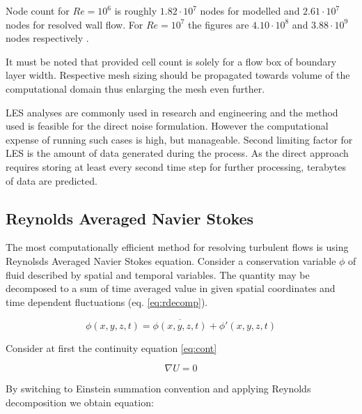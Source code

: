 Node count for $Re = 10^6$ is roughly $1.82 \cdot 10^{7}$ nodes for modelled and $2.61 \cdot 10^{7}$ nodes for resolved wall flow. For $Re = 10^7$ the figures are $4.10 \cdot 10^{8}$ and $3.88 \cdot 10^{9}$ nodes respectively \citep{LES_size}.

It must be noted that provided cell count is solely for a flow box of boundary layer width. Respective mesh sizing should be propagated towards volume of the computational domain thus enlarging the mesh even further.

LES analyses are commonly used in research and engineering and the method used is feasible for the direct noise formulation. However the computational expense of running such cases is high, but manageable. Second limiting factor for LES is the amount of data generated during the process. As the direct approach requires storing at least every second time step for further processing, terabytes of data are predicted.

\subsection{Reynolds Averaged Navier Stokes} \label{RANS}
The most computationally efficient method for resolving turbulent flows is using Reynolsds Averaged Navier Stokes equation. Consider a conservation variable $\phi$ of fluid described by spatial and temporal variables. The quantity may be decomposed to a sum of time averaged value in given spatial coordinates and time dependent fluctuations (eq. \ref{eq:rdecomp}).


\begin{equation} \label{eq:rdecomp}
\phi (x, y, z, t) = \overline{\phi (x, y, z, t)} + \phi ' (x, y, z, t)
\end{equation}

Consider at first the continuity equation \ref{eq:cont}

\begin{equation} \label{eq:cont}
\nabla U = 0
\end{equation}

By switching to Einstein summation convention and applying Reynolds decomposition we obtain equation:

